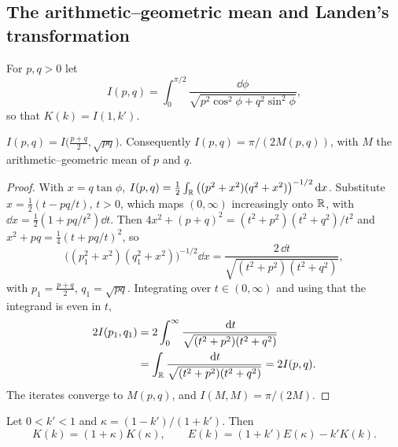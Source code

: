 \subsection{The arithmetic--geometric mean and Landen's transformation}

For $p,q>0$ let
\[
I(p,q)=\int_0^{\pi/2}\frac{\dd\phi}{\sqrt{p^2\cos^2\phi+q^2\sin^2\phi}},
\]
so that $K(k)=I(1,k')$.

\begin{lemma}[Gauss]\label{lem:gauss}
$I(p,q)=I\big(\frac{p+q}2,\sqrt{pq}\big)$. Consequently
$I(p,q)=\pi/(2M(p,q))$, with $M$ the arithmetic--geometric mean of $p$
and $q$.
\end{lemma}

\begin{proof}
With $x=q\tan\phi$, $I(p,q)=\frac12\int_\mathbb R\big((p^2+x^2)(q^2+x^2)\big)^{-1/2}\,\mathrm d x$.
Substitute $x=\frac12(t-pq/t)$, $t>0$, which maps $(0,\infty)$ increasingly
onto $\mathbb R$, with $\dd x=\frac12(1+pq/t^2)\dd t$. Then
$4x^2+(p+q)^2=(t^2+p^2)(t^2+q^2)/t^2$ and $x^2+pq=\frac14(t+pq/t)^2$, so
\[
\big((p_1^2+x^2)(q_1^2+x^2)\big)^{-1/2}\dd x
=\frac{2\,\dd t}{\sqrt{(t^2+p^2)(t^2+q^2)}},
\]
with $p_1=\frac{p+q}2$, $q_1=\sqrt{pq}$. Integrating over $t\in(0,\infty)$
and using that the integrand is even in $t$,
\begin{align*}
2I(p_1,q_1)&=2\int_0^\infty\frac{\,\mathrm d t}{\sqrt{(t^2+p^2)(t^2+q^2)}}\\
&=\int_\mathbb R\frac{\,\mathrm d t}{\sqrt{(t^2+p^2)(t^2+q^2)}}=2I(p,q).
\end{align*}
The
iterates converge to $M(p,q)$, and $I(M,M)=\pi/(2M)$.
\end{proof}

\begin{proposition}[Landen]\label{prop:landen}
Let $0<k'<1$ and $\kappa=(1-k')/(1+k')$. Then
\[
K(k)=(1+\kappa)K(\kappa),\qquad E(k)=(1+k')E(\kappa)-k'K(k).
\]
\end{proposition}

